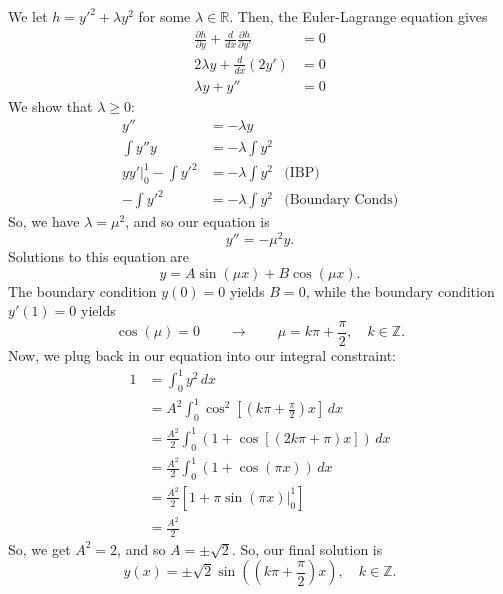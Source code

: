 \documentclass[10pt,letterpaper]{report}
\newcommand{\Z}{\mathbb{Z}}
\newcommand{\R}{\mathbb{R}}
\newcommand{\so}{\qquad \rightarrow \qquad}
\newcommand{\pp}[2]{\frac{\partial{#1}}{\partial{#2}}}
\begin{document}
\begin{enumerate}
We let $h = y'^2 + \lambda y^2$ for some $\lambda \in \R$. Then, the Euler-Lagrange equation gives
\begin{align*}
\pp{h}{y} + \frac{d}{dx}\pp{h}{y'} 
&= 
0
\\
2\lambda y + \frac{d}{dx}\left(2y'\right) 
&=
0
\\
\lambda y + y'' &= 0
\end{align*}
We show that $\lambda \geq 0:$
\begin{align*}
    y'' &= -\lambda y \\
    \int y'' y &= -\lambda \int y^2 \\
    yy'\big\vert_0^1 - \int y'^2 &= -\lambda \int y^2
    &\textrm{(IBP)} \\
    - \int y'^2 &= -\lambda \int y^2 &\textrm{(Boundary Conds)}
\end{align*}
So, we have $\lambda = \mu^2$, and so our equation is
\[
y'' = -\mu^2 y.
\]
Solutions to this equation are 
\[
y = A\sin(\mu x) + B\cos(\mu x).
\]
The boundary condition $y(0) = 0$ yields $B = 0$, while the boundary condition $y'(1) = 0$ yields  
\[
\cos(\mu) = 0 \so \mu = k \pi + \frac{\pi}{2}, \quad k \in \Z.
\]
Now, we plug back in our equation into our integral constraint:
\begin{align*}
    1 &=
    \int_0^1 y^2\,dx 
    \\
    &=
    A^2\int_0^1 \cos^2\left[\left(k \pi + \frac{\pi}{2}\right)x\right]\,dx \\
    &= 
    \frac{A^2}{2}\int_0^1\left(1 + \cos\left[\left(2k \pi + \pi\right)x\right]\right)\,dx
    \\
    &= 
    \frac{A^2}{2}\int_0^1\left(1 + \cos\left(\pi x\right)\right)\,dx 
    \\
    &=
    \frac{A^2}{2}\left[1 + \pi\sin(\pi x)\big\vert_0^1\right] \\
    &=
    \frac{A^2}{2}
\end{align*}
So, we get $A^2 = 2$, and so $A = \pm \sqrt 2$. So, our final solution is
\[
y(x) = \pm\sqrt{2}\sin\left(\left(k\pi + \frac{\pi}{2}\right)x\right),\quad k \in \Z.
\]


\end{enumerate}
\end{document}
